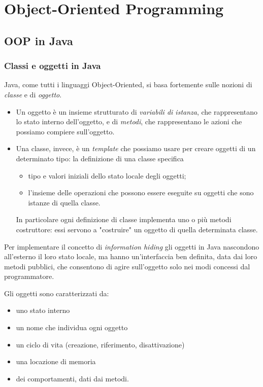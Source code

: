 \part{Object-Oriented Programming}

\chapter{OOP in Java}

\section{Classi e oggetti in Java}

Java, come tutti i linguaggi Object-Oriented, si basa fortemente sulle nozioni di \emph{classe} e di \emph{oggetto}. 

\begin{itemize}
    \item Un oggetto è un insieme strutturato di \emph{variabili di istanza}, che rappresentano lo stato interno dell'oggetto, e di \emph{metodi}, che rappresentano le azioni che possiamo compiere sull'oggetto.
    \item Una classe, invece, è un \emph{template} che possiamo usare per creare oggetti di un determinato tipo: la definizione di una classe specifica \begin{itemize}
        \item tipo e valori iniziali dello stato locale degli oggetti;
        \item l'insieme delle operazioni che possono essere eseguite su oggetti che sono istanze di quella classe.
    \end{itemize}
    In particolare ogni definizione di classe implementa uno o più metodi costruttore: essi servono a "costruire" un oggetto di quella determinata classe.
\end{itemize}

Per implementare il concetto di \emph{information hiding} gli oggetti in Java nascondono all'esterno il loro stato locale, ma hanno un'interfaccia ben definita, data dai loro metodi pubblici, che consentono di agire sull'oggetto solo nei modi concessi dal programmatore.

Gli oggetti sono caratterizzati da: \begin{itemize}
    \item uno stato interno
    \item un nome che individua ogni oggetto
    \item un ciclo di vita (creazione, riferimento, disattivazione)
    \item una locazione di memoria
    \item dei comportamenti, dati dai metodi.
\end{itemize}

